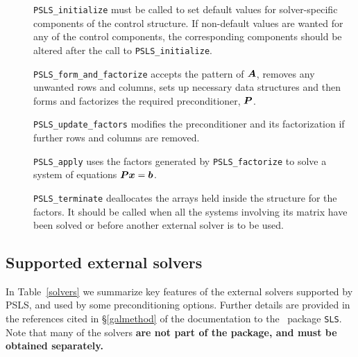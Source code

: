 \documentclass{galahad}
\newcommand{\packagename}{PSLS}
\begin{document}
\begin{description}
\item[] {\tt \packagename\_initialize} must be called to
set default values for solver-specific components of the control structure.
If non-default values are
wanted for any of the control components, the corresponding components
should be altered after the call to {\tt \packagename\_initialize}.

\item[] {\tt \packagename\_form\_and\_factorize} accepts the pattern of ${\bm{A}}$,
 removes any unwanted rows and columns, sets up necessary data structures
 and then forms and factorizes the required preconditioner, ${\bm{P}}$.

\item[] {\tt \packagename\_update\_factors} modifies the preconditioner and
 its factorization if further rows and columns are removed.

\item[] {\tt \packagename\_apply} uses the factors generated by
  {\tt \packagename\_factorize} to
  solve a system of equations ${\bm{P}} {\bm{x}} = {\bm{b}}$.

\item[] {\tt \packagename\_terminate} deallocates the arrays held inside the
  structure for the factors. It should be called
  when all the systems involving its matrix have been solved
  or before another external solver is to be used.
\end{description}

\subsection{Supported external solvers}

In Table~\ref{solvers} we summarize key features of
the external solvers supported by \packagename, and used
by some preconditioning options. Further details
are provided in the references cited in \S\ref{galmethod} of the
documentation to the \libraryname\ package {\tt SLS}. Note that many
of the solvers {\bf are not part of the package, and must be obtained
separately.}
\end{document}
